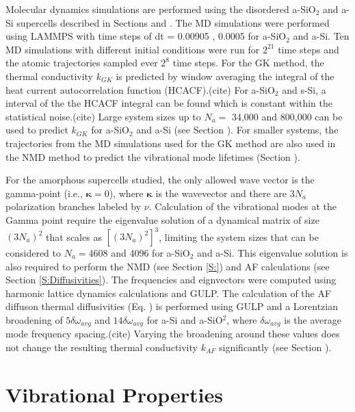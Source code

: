 \documentclass[aps,prb,twocolumn,superscriptaddress,footinbib,amsmath,amssymb,floatfix]{revtex4}
\begin{document}
Molecular dynamics simulations are performed using the disordered 
a-SiO$_2$ and a-Si supercells described in Sections and . 
The MD simulations were performed using LAMMPS\cite{plimpton_fast_1995}  
with time steps of dt = 0.00905 , 0.0005 for a-SiO$_2$ and a-Si. 
Ten MD simulations with different initial conditions were run 
for $2^21$ time steps and the atomic trajectories sampled 
ever $2^8$ time steps. For the GK method, the thermal conductivity 
$k_{GK}$ is 
predicted by window averaging the integral of the heat current 
autocorrelation function (HCACF).(cite) For a-SiO$_2$ and s-Si, a interval 
of the the HCACF integral can be found which is constant within the 
statistical noise.(cite) Large system sizes up to $N_a = $ 34,000 and 
800,000 can be used to predict $k_{GK}$ for a-SiO$_2$ and a-Si 
(see Section ). For smaller 
systems, the trajectories from the MD simulations used for the GK method 
are also used in the NMD method to predict the vibrational mode 
lifetimes (Section ). 

For the amorphous supercells studied,
the only allowed wave vector is the gamma-point (i.e., $\pmb{\kappa}=0$),  
where $\pmb{\kappa}$ is the wavevector and there are $3N_a$ polarization 
branches labeled by $\nu$. 
Calculation of the 
vibrational modes at the Gamma point require the eigenvalue solution 
of a dynamical matrix of size 
$(3N_a)^2$ that scales as $[(3N_a)^2]^3$, limiting the system 
sizes that can be considered to $N_a = 4608$ and 4096 for a-SiO$_2$ and a-Si. 
This eigenvalue solution is also required to perform the NMD (see Section \ref{S:})  
and AF calculations (see Section \ref{S:Diffusivities}). 
The frequencies and eignvectors were computed using harmonic
lattice dynamics calculations and GULP.\cite{gale_general_2003} 
The calculation of the AF diffuson thermal diffusivities (Eq. ) 
is performed using GULP and a Lorentzian 
broadening of $5\delta\omega_{avg}$ and $14\delta\omega_{avg}$ for 
a-Si and a-SiO$^2$, where $\delta\omega_{avg}$ is the average mode 
frequency spacing.(cite) Varying the broadening around these values does not 
change the resulting thermal conductivity $k_{AF}$ significantly 
(see Section ). 

\section{\label{S:Vibrational}Vibrational Properties}
\end{document}
